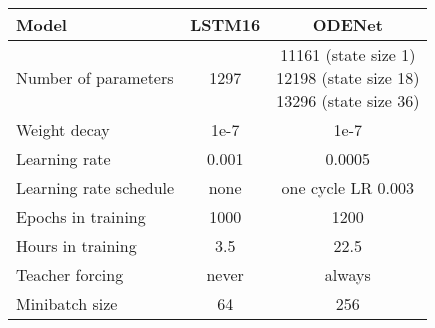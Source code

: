 \begin{tabular}{@{}l|c c @{}}
\toprule
Model & LSTM16 & ODENet \\ \midrule %
Number of   parameters & 1297 & \makecell{11161 (state size 1)\\12198 (state size 18)\\13296 (state size 36)} \\
Weight decay & 1e-7 & 1e-7             \\
Learning rate & 0.001 & 0.0005            \\
Learning rate schedule & none & one cycle LR 0.003      \\
Epochs in training & 1000 & 1200            \\
Hours in training & 3.5 & 22.5           \\
Teacher forcing & never & always       \\ 
Minibatch size & 64 &   256  \\ \bottomrule
\end{tabular}%
